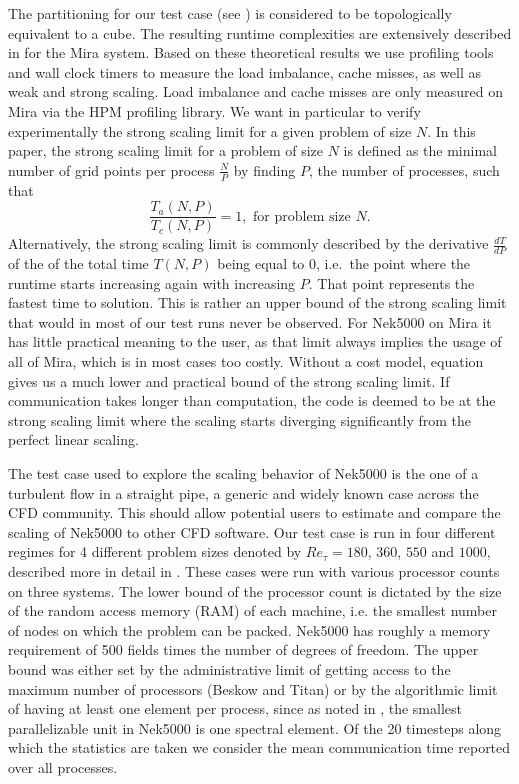 \documentclass{sig-alternate}
\begin{document}
The partitioning for our test case (see ) is considered to be
topologically equivalent to a cube. The resulting runtime complexities are
extensively described in \cite{fischer:scaling} for the Mira system. Based on
these theoretical results we use profiling tools and wall clock timers to
measure the load imbalance,
cache misses, as well as weak and strong scaling. Load imbalance and cache
misses are only measured on Mira via the HPM profiling library. 
We want in particular to verify
experimentally the strong scaling limit for a given problem of size $N$. 
In this paper, the strong scaling limit for a problem of size $N$ is defined
as the minimal number of grid points per process $\frac{N}{P}$ by finding $P$,
the number of processes, such that
\begin{equation}
  \dfrac{T_a(N,P)}{T_c(N,P)}=1,\mbox{ for problem size }N.
  \label{eq:strong}
\end{equation} 
\noindent Alternatively, the strong scaling limit is commonly described by the
derivative $\frac{dT}{dP}$ of the
of the total time $T(N,P)$ being equal to $0$, i.e.\ the point where the runtime
starts increasing again with increasing $P$. That point represents the fastest
time to solution. This is rather an upper bound of the strong scaling
limit that would in most of our test runs never be observed. For Nek5000 on Mira it has
little practical meaning to the user, as that limit always implies the usage
of all of Mira, which is in most cases too costly. Without a cost model,
equation  gives us a much lower and practical bound of the strong
scaling limit. If communication takes longer than
computation, the code is deemed to be at the strong scaling limit where the
scaling starts diverging significantly from the perfect linear scaling. 

The test case used to explore the scaling behavior of Nek5000 is the one of a turbulent 
flow in a straight pipe, a generic and widely known case across the CFD community.
This should allow potential users to estimate and compare the scaling of Nek5000 to other CFD software.
Our test case is run in four different regimes for 4 different problem sizes denoted by
$Re_{\tau} = 180$, $360$, $550$ and $1000$, described more in
detail in . These cases were run with various processor counts 
on three systems. The lower bound of the processor count is dictated by the size 
of the random access memory (RAM) of each machine, i.e. the smallest number of 
nodes on which the problem can be packed. Nek5000 has roughly a memory requirement of 500 fields 
times the number of degrees of freedom. The upper bound was either set by the
administrative limit of getting access to the maximum number of processors
(Beskow and Titan) or by the algorithmic limit of having at least one element 
per process, since as noted in , the smallest parallelizable 
unit in Nek5000 is one spectral element. Of the 20 timesteps along which the
statistics are taken we consider the mean communication time reported over all
processes. 
\end{document}
